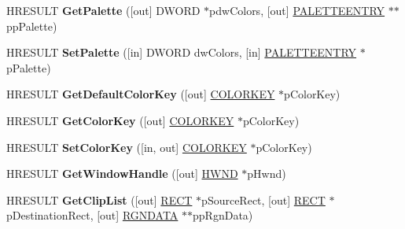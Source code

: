 \begin{DoxyCompactItemize}
\item 
\mbox{\label{interface_i_overlay_a802a0271ea85267bd75576dafe118331}} 
H\+R\+E\+S\+U\+LT {\bfseries Get\+Palette} (\mbox{[}out\mbox{]} D\+W\+O\+RD $\ast$pdw\+Colors, \mbox{[}out\mbox{]} \hyperlink{structtag_p_a_l_e_t_t_e_e_n_t_r_y}{P\+A\+L\+E\+T\+T\+E\+E\+N\+T\+RY} $\ast$$\ast$pp\+Palette)
\item 
\mbox{\label{interface_i_overlay_a877bfee597e9c2c2b4f5a2d6ff87a771}} 
H\+R\+E\+S\+U\+LT {\bfseries Set\+Palette} (\mbox{[}in\mbox{]} D\+W\+O\+RD dw\+Colors, \mbox{[}in\mbox{]} \hyperlink{structtag_p_a_l_e_t_t_e_e_n_t_r_y}{P\+A\+L\+E\+T\+T\+E\+E\+N\+T\+RY} $\ast$p\+Palette)
\item 
\mbox{\label{interface_i_overlay_a7f93399f9b63569b2db4c6500112a553}} 
H\+R\+E\+S\+U\+LT {\bfseries Get\+Default\+Color\+Key} (\mbox{[}out\mbox{]} \hyperlink{structtag_c_o_l_o_r_k_e_y}{C\+O\+L\+O\+R\+K\+EY} $\ast$p\+Color\+Key)
\item 
\mbox{\label{interface_i_overlay_a4b376e88857e56655af70406f82cf12e}} 
H\+R\+E\+S\+U\+LT {\bfseries Get\+Color\+Key} (\mbox{[}out\mbox{]} \hyperlink{structtag_c_o_l_o_r_k_e_y}{C\+O\+L\+O\+R\+K\+EY} $\ast$p\+Color\+Key)
\item 
\mbox{\label{interface_i_overlay_a0150beae066562c0f2dd60b163aaee95}} 
H\+R\+E\+S\+U\+LT {\bfseries Set\+Color\+Key} (\mbox{[}in, out\mbox{]} \hyperlink{structtag_c_o_l_o_r_k_e_y}{C\+O\+L\+O\+R\+K\+EY} $\ast$p\+Color\+Key)
\item 
\mbox{\label{interface_i_overlay_a1566366aab9946964da3851337587141}} 
H\+R\+E\+S\+U\+LT {\bfseries Get\+Window\+Handle} (\mbox{[}out\mbox{]} \hyperlink{interfacevoid}{H\+W\+ND} $\ast$p\+Hwnd)
\item 
\mbox{\label{interface_i_overlay_ac4f8e4b48cdd20efb6955d4e57376dbc}} 
H\+R\+E\+S\+U\+LT {\bfseries Get\+Clip\+List} (\mbox{[}out\mbox{]} \hyperlink{structtag_r_e_c_t}{R\+E\+CT} $\ast$p\+Source\+Rect, \mbox{[}out\mbox{]} \hyperlink{structtag_r_e_c_t}{R\+E\+CT} $\ast$p\+Destination\+Rect, \mbox{[}out\mbox{]} \hyperlink{struct___r_g_n_d_a_t_a}{R\+G\+N\+D\+A\+TA} $\ast$$\ast$pp\+Rgn\+Data)

\end{DoxyCompactItemize}
